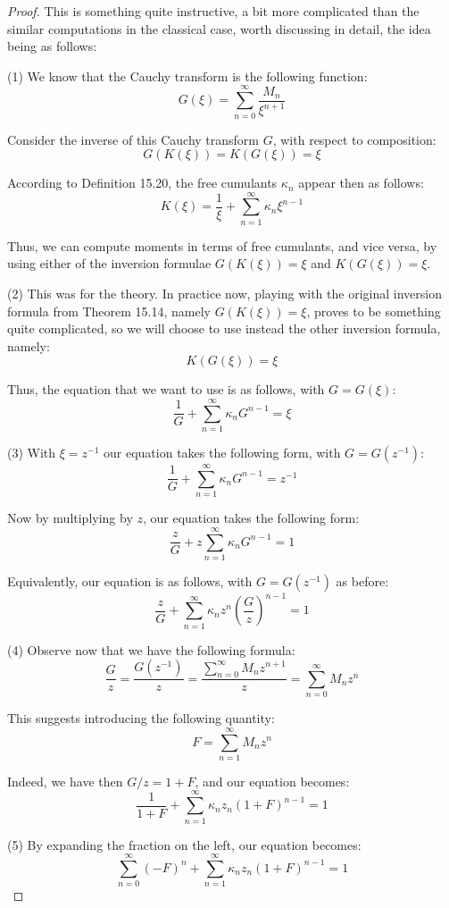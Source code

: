 \documentclass[12pt]{amsbook}
\begin{document}
\begin{proof}
This is something quite instructive, a bit more complicated than the similar computations in the classical case, worth discussing in detail, the idea being as follows:

\medskip

(1) We know that the Cauchy transform is the following function:
$$G(\xi)=\sum_{n=0}^\infty\frac{M_n}{\xi^{n+1}}$$

Consider the inverse of this Cauchy transform $G$, with respect to composition:
$$G(K(\xi))=K(G(\xi))=\xi$$

According to Definition 15.20, the free cumulants $\kappa_n$ appear then as follows:
$$K(\xi)=\frac{1}{\xi}+\sum_{n=1}^\infty\kappa_n\xi^{n-1}$$

Thus, we can compute moments in terms of free cumulants, and vice versa, by using either of the inversion formulae $G(K(\xi))=\xi$ and $K(G(\xi))=\xi$.

\medskip

(2) This was for the theory. In practice now, playing with the original inversion formula from Theorem 15.14, namely $G(K(\xi))=\xi$, proves to be something quite complicated, so we will choose to use instead the other inversion formula, namely:
$$K(G(\xi))=\xi$$

Thus, the equation that we want to use is as follows, with $G=G(\xi)$:
$$\frac{1}{G}+\sum_{n=1}^\infty\kappa_nG^{n-1}=\xi$$

(3) With $\xi=z^{-1}$ our equation takes the following form, with $G=G(z^{-1})$:
$$\frac{1}{G}+\sum_{n=1}^\infty\kappa_nG^{n-1}=z^{-1}$$

Now by multiplying by $z$, our equation takes the following form:
$$\frac{z}{G}+z\sum_{n=1}^\infty\kappa_nG^{n-1}=1$$

Equivalently, our equation is as follows, with $G=G(z^{-1})$ as before:
$$\frac{z}{G}+\sum_{n=1}^\infty\kappa_nz^n\left(\frac{G}{z}\right)^{n-1}=1$$

(4) Observe now that we have the following formula:
$$\frac{G}{z}=\frac{G(z^{-1})}{z}=\frac{\sum_{n=0}^\infty M_nz^{n+1}}{z}=\sum_{n=0}^\infty M_nz^n$$

This suggests introducing the following quantity:
$$F=\sum_{n=1}^\infty M_nz^n$$

Indeed, we have then $G/z=1+F$, and our equation becomes:
$$\frac{1}{1+F}+\sum_{n=1}^\infty\kappa_nz_n(1+F)^{n-1}=1$$

(5) By expanding the fraction on the left, our equation becomes:
$$\sum_{n=0}^\infty(-F)^n+\sum_{n=1}^\infty\kappa_nz_n(1+F)^{n-1}=1$$


\end{proof}
\end{document}
